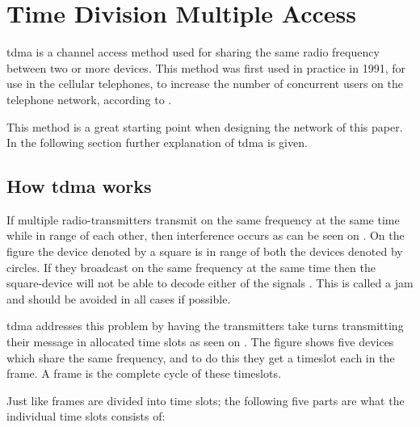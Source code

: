 \chapter{Time Division Multiple Access}\label{TDMA}

\gls{tdma} is a channel access method used for sharing the same radio frequency between two or more devices.
This method was first used in practice in 1991, for use in the cellular telephones, to increase the number of concurrent users on the telephone network, according to \citet{networkencyclopedia2013time}.

This method is a great starting point when designing the network of this paper.
In the following section further explanation of \gls{tdma} is given.

\section{How \acrshort{tdma} works}

If multiple radio-transmitters transmit on the same frequency at the same time while in range of each other, then interference occurs as can be seen on . 
On the figure the device denoted by a square is in range of both the devices denoted by circles. 
If they broadcast on the same frequency at the same time then the square-device will not be able to decode either of the signals \cite{networkencyclopedia2013time, networkencyclopedia2013advanced}.
This is called a jam and should be avoided in all cases if possible.


\gls{tdma} addresses this problem by having the transmitters take turns transmitting their message in allocated time slots as seen on .
The figure shows five devices which share the same frequency, and to do this they get a timeslot each in the frame.
A frame is the complete cycle of these timeslots.


\noindent
Just like frames are divided into time slots; the following five parts are what the individual time slots consists of:

